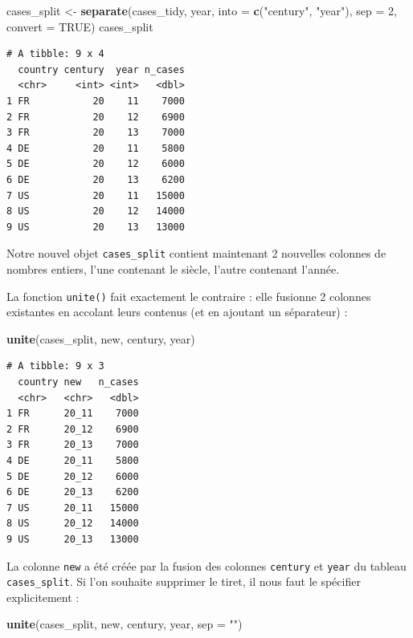 \documentclass[
  a4paper,
]{article}
\newenvironment{Shaded}{\begin{snugshade}}{\end{snugshade}}
\newcommand{\DataTypeTok}[1]{\textcolor[rgb]{0.00,0.34,0.68}{#1}}
\newcommand{\DecValTok}[1]{\textcolor[rgb]{0.69,0.50,0.00}{#1}}
\newcommand{\KeywordTok}[1]{\textcolor[rgb]{0.12,0.11,0.11}{\textbf{#1}}}
\newcommand{\NormalTok}[1]{\textcolor[rgb]{0.12,0.11,0.11}{#1}}
\newcommand{\OtherTok}[1]{\textcolor[rgb]{0.00,0.43,0.16}{#1}}
\newcommand{\StringTok}[1]{\textcolor[rgb]{0.75,0.01,0.01}{#1}}
\begin{document}
\begin{Shaded}
\begin{Highlighting}[]
\NormalTok{cases_split <-}\StringTok{ }\KeywordTok{separate}\NormalTok{(cases_tidy, year, }\DataTypeTok{into =} \KeywordTok{c}\NormalTok{(}\StringTok{"century"}\NormalTok{, }\StringTok{"year"}\NormalTok{), }
    \DataTypeTok{sep =} \DecValTok{2}\NormalTok{, }\DataTypeTok{convert =} \OtherTok{TRUE}\NormalTok{)}
\NormalTok{cases_split}
\end{Highlighting}
\end{Shaded}

\begin{verbatim}
# A tibble: 9 x 4
  country century  year n_cases
  <chr>     <int> <int>   <dbl>
1 FR           20    11    7000
2 FR           20    12    6900
3 FR           20    13    7000
4 DE           20    11    5800
5 DE           20    12    6000
6 DE           20    13    6200
7 US           20    11   15000
8 US           20    12   14000
9 US           20    13   13000
\end{verbatim}

Notre nouvel objet \texttt{cases\_split} contient maintenant 2 nouvelles colonnes de nombres entiers, l'une contenant le siècle, l'autre contenant l'année.

La fonction \texttt{unite()} fait exactement le contraire : elle fusionne 2 colonnes existantes en accolant leurs contenus (et en ajoutant un séparateur) :

\begin{Shaded}
\begin{Highlighting}[]
\KeywordTok{unite}\NormalTok{(cases_split, new, century, year)}
\end{Highlighting}
\end{Shaded}

\begin{verbatim}
# A tibble: 9 x 3
  country new   n_cases
  <chr>   <chr>   <dbl>
1 FR      20_11    7000
2 FR      20_12    6900
3 FR      20_13    7000
4 DE      20_11    5800
5 DE      20_12    6000
6 DE      20_13    6200
7 US      20_11   15000
8 US      20_12   14000
9 US      20_13   13000
\end{verbatim}

La colonne \texttt{new} a été créée par la fusion des colonnes \texttt{century} et \texttt{year} du tableau \texttt{cases\_split}. Si l'on souhaite supprimer le tiret, il nous faut le spécifier explicitement :

\begin{Shaded}
\begin{Highlighting}[]
\KeywordTok{unite}\NormalTok{(cases_split, new, century, year, }\DataTypeTok{sep =} \StringTok{""}\NormalTok{)}
\end{Highlighting}
\end{Shaded}
\end{document}
